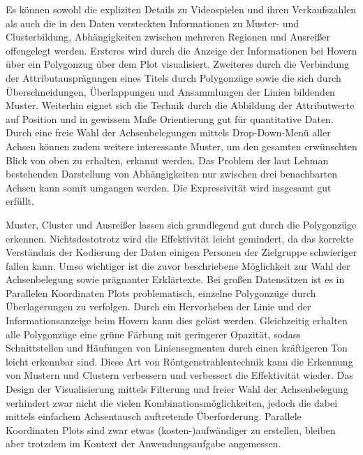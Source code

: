 \documentclass[usegeometry=true]{scrartcl}
\begin{document}
Es können sowohl die expliziten Details zu Videospielen und ihren Verkaufszahlen als auch die in den Daten versteckten Informationen zu Muster- und Clusterbildung, Abhängigkeiten zwischen mehreren Regionen und Ausreißer offengelegt werden.
Ersteres wird durch die Anzeige der Informationen bei Hovern über ein Polygonzug über dem Plot visualisiert. 
Zweiteres durch die Verbindung der Attributausprägungen eines Titels durch Polygonzüge sowie die sich durch Überschneidungen, Überlappungen und Ansammlungen der Linien bildenden Muster. 
Weiterhin eignet sich die Technik durch die Abbildung der Attributwerte auf Position und in gewissem Maße Orientierung gut für quantitative Daten.%
Durch eine freie Wahl der Achsenbelegungen mittels Drop-Down-Menü aller Achsen können zudem weitere interessante Muster, um den gesamten erwünschten Blick von oben zu erhalten, erkannt werden. 
Das Problem der laut Lehman bestehenden Darstellung von Abhängigkeiten nur zwischen drei benachbarten Achsen kann somit umgangen werden. %
Die Expressivität wird insgesamt gut erfüllt.

Muster, Cluster und Ausreißer lassen sich grundlegend gut durch die Polygonzüge erkennen. 
Nichtsdestotrotz wird die Effektivität leicht gemindert, da das korrekte Verständnis der Kodierung der Daten einigen Personen der Zielgruppe schwieriger fallen kann.
Umso wichtiger ist die zuvor beschriebene Möglichkeit zur Wahl der Achsenbelegung sowie prägnanter Erklärtexte.
Bei großen Datensätzen ist es in Parallelen Koordinaten Plots problematisch, einzelne Polygonzüge durch Überlagerungen zu verfolgen.
Durch ein Hervorheben der Linie und der Informationsanzeige beim Hovern kann dies gelöst werden. 
Gleichzeitig erhalten alle Polygonzüge eine grüne Färbung mit geringerer Opazität, sodass Schnittstellen und Häufungen von Liniensegmenten durch einen kräftigeren Ton leicht erkennbar sind. 
Diese Art von Röntgenstrahlentechnik kann die Erkennung von Mustern und Clustern verbessern und verbessert die Effektivität wieder.
Das Design der Visualisierung mittels Filterung und freier Wahl der Achsenbelegung verhindert zwar nicht die vielen Kombinationsmöglichkeiten, jedoch die dabei mittels einfachem Achsentausch auftretende Überforderung.
Parallele Koordinaten Plots sind zwar etwas (kosten-)aufwändiger zu erstellen, bleiben aber trotzdem im Kontext der Anwendungsaufgabe angemessen.
\end{document}
